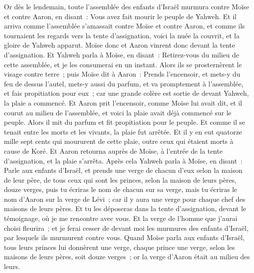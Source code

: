 \begin{multicols}{2}
Or dès le lendemain, toute l'assemblée des enfants d'Israël murmura contre Moïse et contre Aaron, en disant~: Vous avez fait mourir le peuple de Yahweh.
Et il arriva comme l'assemblée s'amassait contre Moïse et contre Aaron, et comme ils tournaient les regards vers la tente d'assignation, voici la nuée la couvrit, et la gloire de Yahweh apparut.
Moïse donc et Aaron vinrent donc devant la tente d'assignation.
Et Yahweh parla à Moïse, en disant~:
Retirez-vous du milieu de cette assemblée, et je les consumerai en un instant. Alors ils se prosternèrent le visage contre terre~;
puis Moïse dit à Aaron~: Prends l'encensoir, et mets-y du feu de dessus l'autel, mets-y aussi du parfum, et va promptement à l'assemblée, et fais propitiation pour eux~; car une grande colère est sortie de devant Yahweh, la plaie a commencé.
Et Aaron prit l'encensoir, comme Moïse lui avait dit, et il courut au milieu de l'assemblée, et voici la plaie avait déjà commencé sur le peuple. Alors il mit du parfum et fit propitiation pour le peuple.
Et comme il se tenait entre les morts et les vivants, la plaie fut arrêtée.
Et il y en eut quatorze mille sept cents qui moururent de cette plaie, outre ceux qui étaient morts à cause de Koré.
Et Aaron retourna auprès de Moïse, à l'entrée de la tente d'assignation, et la plaie s'arrêta.
\VerseOne{}Après cela Yahweh parla à Moïse, en disant~:
Parle aux enfants d'Israël, et prends une verge de chacun d'eux selon la maison de leur père, de tous ceux qui sont les princes, selon la maison de leurs pères, douze verges, puis tu écriras le nom de chacun sur sa verge,
mais tu écriras le nom d'Aaron sur la verge de Lévi~; car il y aura une verge pour chaque chef des maisons de leurs pères.
Et tu les déposeras dans la tente d'assignation, devant le témoignage, où je me rencontre avec vous.
Et la verge de l'homme que j'aurai choisi fleurira~; et je ferai cesser de devant moi les murmures des enfants d'Israël, par lesquels ils murmurent contre vous.
Quand Moïse parla aux enfants d'Israël, tous leurs princes lui donnèrent une verge, chaque prince une verge, selon les maisons de leurs pères, soit douze verges~; or la verge d'Aaron était au milieu des leurs.

\end{multicols}
